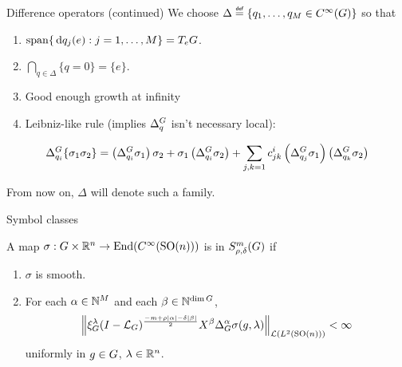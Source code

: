 \documentclass{beamer}
\begin{document}
\begin{frame}{Difference operators (continued)}
    We choose $\Delta \defeq \{q_1, \dots, q_M \in \SmoothFunctions \Group\}$ so that
    \begin{enumerate}
        \item
            $\operatorname{span} \{\,\mathrm{d} q_j(e) : j = 1, \dots, M\} = T_e G$.
            \pause
        \item
            $\bigcap_{q \in \Delta} \{q = 0\} = \{e\}$.
            \pause
        \item
            Good enough growth at infinity
            \pause
        \item
            Leibniz-like rule (implies ${\Delta^{G}_{q}}$ isn't necessary local):
    \end{enumerate}
    \begin{align*}
        {\Delta^{G}_{q_i}} \{\sigma_1 \sigma_2\}
        =
        \left({\Delta^{G}_{q_i}} \sigma_1 \right) \sigma_2
        + \sigma_1 \left({\Delta^{G}_{q_i}} \sigma_2\right)
        + \sum_{j, k = 1} c^i_{j k} \left({\Delta^{G}_{q_j}} \sigma_1\right) \left({\Delta^{G}_{q_k}} \sigma_2\right)
    \end{align*}

    \pause

    From now on,
    $\Delta$ will denote such a family.
\end{frame}

\begin{frame}{Symbol classes}
    \begin{definition}
        A map $\sigma: G \times \mathbb{R}^n \to \operatorname{End} ({C^\infty({\mathrm{SO} (n)})})$ is in $S^{m}_{\rho, \delta}(G)$ if
        \begin{enumerate}
            \item
                $\sigma$ is smooth.
            \item
                For each $\alpha \in \mathbb{N}^M$ and each $\beta \in \mathbb{N}^{\dim G}$,
                \begin{align*}
                    \norm [\Lin {\Lebesgue 2 {\SpecialOrthogonalGroup n}}] {
                        \Rep \lambda \BesselPotential {-m + \rho \abs \alpha - \delta \abs \beta}
                        \LeftDifferentialOperator \beta \DifferenceOperatorOrder \alpha \sigma(g, \lambda)
                    } < \infty
                \end{align*}
                uniformly in $g \in G$, $\lambda \in \mathbb{R}^n$.
        \end{enumerate}
    \end{definition}
\end{frame}
\end{document}
